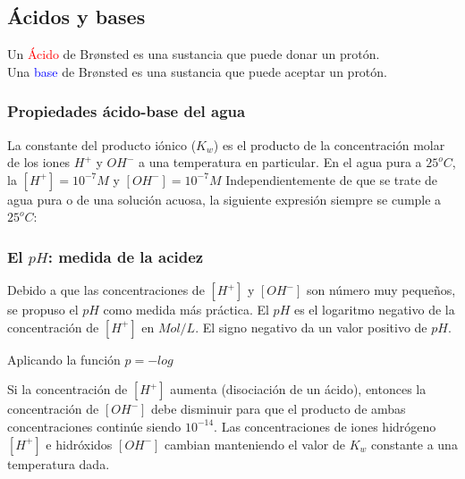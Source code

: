     \subsection{Ácidos y bases}
    \sangria{} Un \textcolor{red}{Ácido} de Brønsted es una sustancia que puede donar un protón. \\ \sangria{} Una \textcolor{blue}{base} de Brønsted es una sustancia que puede aceptar un protón. 
    \subsubsection{Propiedades ácido-base del agua}
        \sangria{} La constante del producto iónico ($K_w$) es el producto de la concentración molar de los iones $H^+$ y $OH^-$ a una temperatura en particular. En el agua pura a $25^oC$, la $[H^+] = 10^{-7}M$ y $[OH^-]= 10^{-7}M$
        \sangria{} Independientemente de que se trate de agua pura o de una solución acuosa, la siguiente expresión siempre se cumple a $25^oC$: 
    \subsubsection{El $pH$: medida de la acidez}
    \sangria{} Debido a que las concentraciones de $[H^+]$ y $[OH^-]$ son número muy pequeños, se propuso el $pH$ como medida más práctica. El $pH$ es el logaritmo negativo de la concentración de $[H^+]$ en $Mol / L$. El signo negativo da un valor positivo de $pH$.
     \begin{center} Aplicando la función $p = -log$ \end{center}
     \saltoPag{}
    \sangria{} Si la concentración de $[H^+]$ aumenta (disociación de un ácido), entonces la concentración de $[OH^-]$ debe disminuir para que el producto de ambas concentraciones continúe siendo $10^{-14}$.
    \sangria{} Las concentraciones de iones hidrógeno $[H^+]$ e hidróxidos $[OH^-]$ cambian manteniendo el valor de $K_w$ constante a una temperatura dada.
